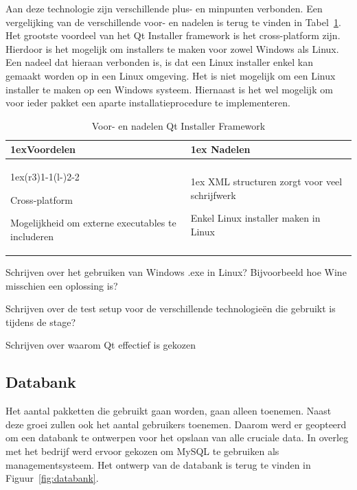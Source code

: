 Aan deze technologie zijn verschillende plus- en minpunten verbonden.
Een vergelijking van de verschillende voor- en nadelen is terug te vinden in Tabel~\ref{tab:qt}.
Het grootste voordeel van het Qt Installer framework is het cross-platform zijn.
Hierdoor is het mogelijk om installers te maken voor zowel Windows als Linux.
Een nadeel dat hieraan verbonden is, is dat een Linux installer enkel kan gemaakt worden op in een Linux omgeving.
Het is niet mogelijk om een Linux installer te maken op een Windows systeem.
Hiernaast is het wel mogelijk om voor ieder pakket een aparte installatieprocedure te implementeren.

\begin{table}
\begin{tabularx}{\linewidth}{>{\parskip1ex}X@{\kern4\tabcolsep}>{\parskip1ex}X}
\toprule
\hfil\bfseries Voordelen
&
\hfil\bfseries Nadelen
\\\cmidrule(r{3\tabcolsep}){1-1}\cmidrule(l{-\tabcolsep}){2-2}

Cross-platform \par
Mogelijkheid om externe executables te includeren
&
XML structuren zorgt voor veel schrijfwerk \par
Enkel Linux installer maken in Linux

\\\bottomrule
\end{tabularx}
\caption{Voor- en nadelen Qt Installer Framework}
\label{tab:qt}
\end{table}

Schrijven over het gebruiken van Windows .exe in Linux? Bijvoorbeeld hoe Wine misschien een oplossing is?

Schrijven over de test setup voor de verschillende technologieën die gebruikt is tijdens de stage?

Schrijven over waarom Qt effectief is gekozen

\subsection{Databank}\label{sec:databank}
Het aantal pakketten die gebruikt gaan worden, gaan alleen toenemen.
Naast deze groei zullen ook het aantal gebruikers toenemen.
Daarom werd er geopteerd om een databank te ontwerpen voor het opslaan van alle cruciale data.
In overleg met het bedrijf werd ervoor gekozen om MySQL te gebruiken als managementsysteem.
Het ontwerp van de databank is terug te vinden in Figuur~\vref{fig:databank}.

